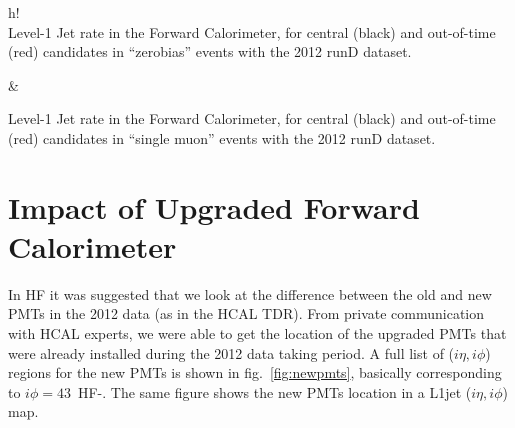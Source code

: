 \documentclass[11pt]{cmspaperpdf}
\begin{document}
\begin{2figures}{h!}
 \\
\caption{Level-1 Jet rate in the Forward Calorimeter, for central (black) and out-of-time (red) candidates in ``zerobias'' events with the 2012 runD dataset.}\label{fig:fwdrate_minb} &
\caption{Level-1 Jet rate in the Forward Calorimeter, for central (black) and out-of-time (red) candidates in ``single muon'' events with the 2012 runD dataset.}\label{fig:fwdrate_smu}
\end{2figures}

\section{Impact of Upgraded Forward Calorimeter}

 In HF it was suggested that we look at the difference between the old and new PMTs in the 2012 data (as in the HCAL TDR). From private communication with HCAL experts, we were able to get the location of the upgraded PMTs that were already installed during the 2012 data taking period. A full list of ($i\eta,i\phi$) regions for the new PMTs is shown in fig.~\ref{fig:newpmts}, basically corresponding to $i \phi=43$~HF-. The same figure shows the new PMTs location in a L1jet ($i\eta,i\phi$) map.
\end{document}
